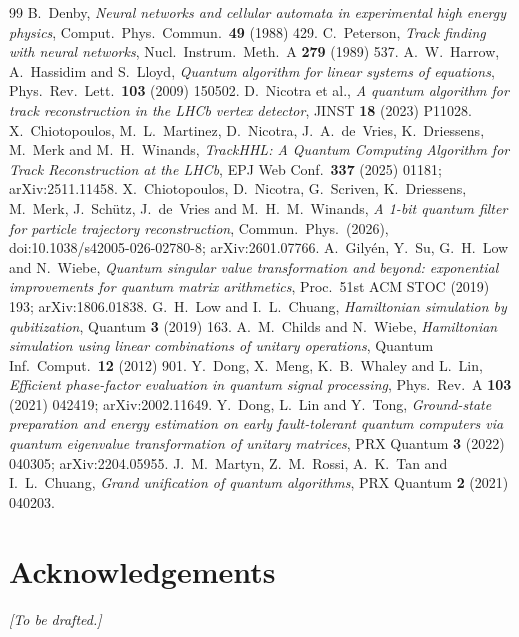 \documentclass[11pt,a4paper]{article}
\begin{document}
\begin{thebibliography}{99}
 B.~Denby, \emph{Neural networks and cellular automata in experimental high energy physics}, Comput.\ Phys.\ Commun.\ \textbf{49} (1988) 429.
 C.~Peterson, \emph{Track finding with neural networks}, Nucl.\ Instrum.\ Meth.\ A \textbf{279} (1989) 537.
 A.~W.~Harrow, A.~Hassidim and S.~Lloyd, \emph{Quantum algorithm for linear systems of equations}, Phys.\ Rev.\ Lett.\ \textbf{103} (2009) 150502.
 D.~Nicotra et al., \emph{A quantum algorithm for track reconstruction in the LHCb vertex detector}, JINST \textbf{18} (2023) P11028.
 X.~Chiotopoulos, M.~L.~Martinez, D.~Nicotra, J.~A.~de~Vries, K.~Driessens, M.~Merk and M.~H.~Winands, \emph{TrackHHL: A Quantum Computing Algorithm for Track Reconstruction at the LHCb}, EPJ Web Conf.\ \textbf{337} (2025) 01181; arXiv:2511.11458.
 X.~Chiotopoulos, D.~Nicotra, G.~Scriven, K.~Driessens, M.~Merk, J.~Sch\"utz, J.~de~Vries and M.~H.~M.~Winands, \emph{A 1-bit quantum filter for particle trajectory reconstruction}, Commun.\ Phys.\ (2026), doi:10.1038/s42005-026-02780-8; arXiv:2601.07766.
 A.~Gily\'en, Y.~Su, G.~H.~Low and N.~Wiebe, \emph{Quantum singular value transformation and beyond: exponential improvements for quantum matrix arithmetics}, Proc.\ 51st ACM STOC (2019) 193; arXiv:1806.01838.
 G.~H.~Low and I.~L.~Chuang, \emph{Hamiltonian simulation by qubitization}, Quantum \textbf{3} (2019) 163.
 A.~M.~Childs and N.~Wiebe, \emph{Hamiltonian simulation using linear combinations of unitary operations}, Quantum Inf.\ Comput.\ \textbf{12} (2012) 901.
 Y.~Dong, X.~Meng, K.~B.~Whaley and L.~Lin, \emph{Efficient phase-factor evaluation in quantum signal processing}, Phys.\ Rev.\ A \textbf{103} (2021) 042419; arXiv:2002.11649.
 Y.~Dong, L.~Lin and Y.~Tong, \emph{Ground-state preparation and energy estimation on early fault-tolerant quantum computers via quantum eigenvalue transformation of unitary matrices}, PRX Quantum \textbf{3} (2022) 040305; arXiv:2204.05955.
 J.~M.~Martyn, Z.~M.~Rossi, A.~K.~Tan and I.~L.~Chuang, \emph{Grand unification of quantum algorithms}, PRX Quantum \textbf{2} (2021) 040203.
\end{thebibliography}

\section*{Acknowledgements}
\textit{[To be drafted.]}
\end{document}
